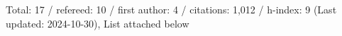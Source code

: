 Total: 17 / refereed: 10 / first author: 4 / citations: 1,012 / h-index: 9 (Last updated: 2024-10-30), List attached below